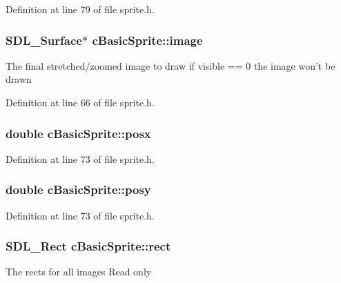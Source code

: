 Definition at line 79 of file sprite.\-h.

\hypertarget{classc_basic_sprite_af504a7d23fed0ba6975f701e2a056dd7}{
\subsubsection[{image}]{\setlength{\rightskip}{0pt plus 5cm}S\-D\-L\-\_\-\-Surface$\ast$ c\-Basic\-Sprite\-::image}}\label{classc_basic_sprite_af504a7d23fed0ba6975f701e2a056dd7}
The final stretched/zoomed image to draw if visible == 0 the image won't be drawn 

Definition at line 66 of file sprite.\-h.

\hypertarget{classc_basic_sprite_a2c05526f8e98074b549e692822ab49b2}{
\subsubsection[{posx}]{\setlength{\rightskip}{0pt plus 5cm}double c\-Basic\-Sprite\-::posx}}\label{classc_basic_sprite_a2c05526f8e98074b549e692822ab49b2}


Definition at line 73 of file sprite.\-h.

\hypertarget{classc_basic_sprite_a9372069c238077090f0dd7a4e5c27e98}{
\subsubsection[{posy}]{\setlength{\rightskip}{0pt plus 5cm}double c\-Basic\-Sprite\-::posy}}\label{classc_basic_sprite_a9372069c238077090f0dd7a4e5c27e98}


Definition at line 73 of file sprite.\-h.

\hypertarget{classc_basic_sprite_a6f5d45a0db04ae6c516f88ccd3ec83ad}{
\subsubsection[{rect}]{\setlength{\rightskip}{0pt plus 5cm}S\-D\-L\-\_\-\-Rect c\-Basic\-Sprite\-::rect}}\label{classc_basic_sprite_a6f5d45a0db04ae6c516f88ccd3ec83ad}
The rects for all images Read only 

